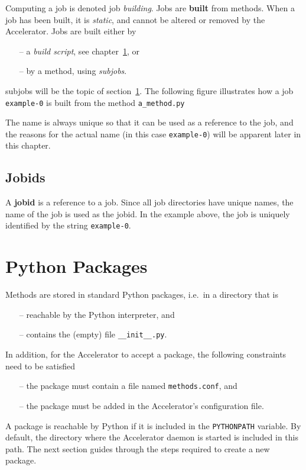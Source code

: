 Computing a job is denoted job \textsl{building}.
Jobs are \textbf{built} from methods.  When a job has been built, it
is \textsl{static}, and cannot be altered or removed by the
Accelerator.  Jobs are built either by
\begin{itemize}
\item[--] a \textsl{build script}, see chapter~\ref{}, or
\item[--] by a method, using \textsl{subjobs}.
\end{itemize}
subjobs will be the topic of section~\ref{}.  The following figure
illustrates how a job \texttt{example-0} is built from the
method \texttt{a\_method.py}
\begin{figure}[h!]
  \begin{center}
    
    \label{fig:method}
  \end{center}
\end{figure}

\noindent The name is always unique so that it
can be used as a reference to the job, and the reasons for the actual
name (in this case \texttt{example-0}) will be apparent later in this
chapter.



\subsection{Jobids}
A \textbf{jobid} is a reference to a job.  Since all job directories
have unique names, the name of the job is used as the jobid.  In the
example above, the job is uniquely identified by the
string \texttt{example-0}.



\section{Python Packages}
Methods are stored in standard Python packages, i.e.\ in a directory that is
\begin{itemize}
\item[--] reachable by the Python interpreter, and
\item[--] contains the (empty) file \texttt{\_\_init\_\_.py}.
\end{itemize}
In addition, for the Accelerator to accept a package, the following
constraints need to be satisfied
\begin{itemize}
\item[--] the package must contain a file named \texttt{methods.conf}, and
\item[--] the package must be added in the Accelerator's configuration file.
\end{itemize}
A package is reachable by Python if it is included in
the \texttt{PYTHONPATH} variable.  By default, the directory where the
Accelerator daemon is started is included in this path.  The next
section guides through the steps required to create a new package.



